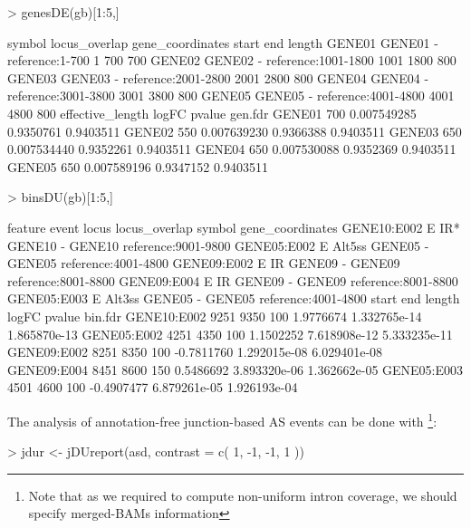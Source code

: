 \documentclass{article}
\begin{document}
\begin{Schunk}
\begin{Sinput}
> genesDE(gb)[1:5,]
\end{Sinput}
\begin{Soutput}
       symbol locus_overlap    gene_coordinates start  end length
GENE01 GENE01             -     reference:1-700     1  700    700
GENE02 GENE02             - reference:1001-1800  1001 1800    800
GENE03 GENE03             - reference:2001-2800  2001 2800    800
GENE04 GENE04             - reference:3001-3800  3001 3800    800
GENE05 GENE05             - reference:4001-4800  4001 4800    800
       effective_length       logFC    pvalue   gen.fdr
GENE01              700 0.007549285 0.9350761 0.9403511
GENE02              550 0.007639230 0.9366388 0.9403511
GENE03              650 0.007534440 0.9352261 0.9403511
GENE04              650 0.007530088 0.9352369 0.9403511
GENE05              650 0.007589196 0.9347152 0.9403511
\end{Soutput}
\begin{Sinput}
> binsDU(gb)[1:5,]
\end{Sinput}
\begin{Soutput}
            feature  event  locus locus_overlap symbol    gene_coordinates
GENE10:E002       E    IR* GENE10             - GENE10 reference:9001-9800
GENE05:E002       E Alt5ss GENE05             - GENE05 reference:4001-4800
GENE09:E002       E     IR GENE09             - GENE09 reference:8001-8800
GENE09:E004       E     IR GENE09             - GENE09 reference:8001-8800
GENE05:E003       E Alt3ss GENE05             - GENE05 reference:4001-4800
            start  end length      logFC       pvalue      bin.fdr
GENE10:E002  9251 9350    100  1.9776674 1.332765e-14 1.865870e-13
GENE05:E002  4251 4350    100  1.1502252 7.618908e-12 5.333235e-11
GENE09:E002  8251 8350    100 -0.7811760 1.292015e-08 6.029401e-08
GENE09:E004  8451 8600    150  0.5486692 3.893320e-06 1.362662e-05
GENE05:E003  4501 4600    100 -0.4907477 6.879261e-05 1.926193e-04
\end{Soutput}
\end{Schunk}


The analysis of annotation-free junction-based AS events can be done with \footnote{Note that as we required to compute non-uniform intron coverage, we should specify merged-BAMs information}:

\begin{Schunk}
\begin{Sinput}
> jdur    <- jDUreport(asd, contrast =  c( 1, -1, -1, 1 ))
\end{Sinput}
\end{Schunk}
\end{document}
